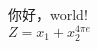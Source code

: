 \documentclass[12pt]{article}
\begin{document}
你好，world!\\[5pt]
$Z = x_1 + x_2^{4\pi e}$
\end{document}
